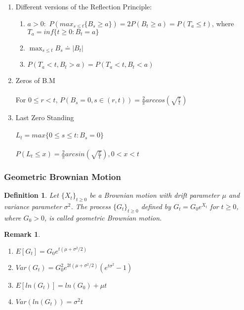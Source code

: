 \documentclass[12pt]{article}
\newtheorem{definition}{Definition}
\newtheorem*{remark}{Remark}
\begin{document}
\begin{enumerate}
    \item Different versions of the Reflection Principle:
    \begin{enumerate}
        \item $a > 0:$
            $P(max_{s \leq t}\{B_s \geq a\}) = 2 P(B_t \geq a)
            = P(T_a \leq t)$, where $T_a = inf\{t \geq 0: B_t = a\}$
        \item $\max_{s\leq t} B_s \doteq  |B_t|$
        \item $P(T_a < t, B_t > a) = P(T_a < t, B_t < a)$
    \end{enumerate}
    \item Zeros of B.M
    \\
    \\For $0 \leq r < t$, $P(B_s = 0, s\in (r,t)) = \frac{2}{\pi}arccos(\sqrt{\frac{r}{t}})$
    \item Last Zero Standing
    \\
    \\$L_t = max\{0 \leq s \leq t: B_s = 0\}$
    \\
    \\$P(L_t \leq x) = \frac{2}{\pi}arcsin(\sqrt{\frac{x}{t}}), 0 < x < t$
\end{enumerate}

\subsubsection{Geometric Brownian Motion}

\begin{definition}
    Let $\{X_t\}_{t\geq0}$ be a Brownian motion with drift parameter $\mu$ and variance parameter $\sigma^2$. The process $\{G_t\}_{t\geq0}$ defined by $G_t = G_0 e^{X_t}$ for $t \geq 0$, where $G_0 > 0$, is called geometric Brownian motion.
\end{definition}

\begin{remark}
    \begin{enumerate}
        \item $E[G_t] = G_0e^{t(\mu+\sigma^2/2)}$
        \item $Var(G_t) = G_0^2e^{2t(\mu+\sigma^2/2)}(e^{t\sigma^2}-1)$
        \item $E[ln(G_t)] = ln(G_0) +\mu t$
        \item $Var(ln(G_t)) = \sigma^2 t$
    \end{enumerate}
\end{remark}
\end{document}
